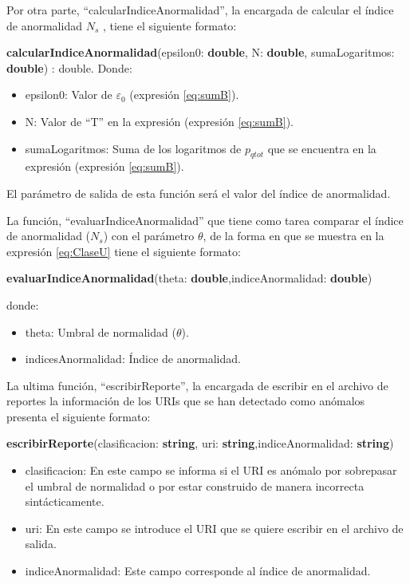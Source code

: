Por otra parte, ``calcularIndiceAnormalidad'', la encargada de calcular
el  índice de anormalidad $N_{s}$ , tiene el siguiente formato:

\textbf{calcularIndiceAnormalidad}(epsilon0: \textbf{double}, N: \textbf{double}, sumaLogaritmos: \textbf{double}) : double. Donde:

\begin{itemize}
\item epsilon0: Valor de $\varepsilon_{0}$ (expresión \ref{eq:sumB}).
\item N: Valor de ``T'' en la expresión (expresión \ref{eq:sumB}).
\item sumaLogaritmos: Suma de los logaritmos de $p_{qtot}$ que se encuentra en la expresión (expresión \ref{eq:sumB}).
\end{itemize}

El parámetro de salida de esta función será el valor del  índice de anormalidad.

La función, ``evaluarIndiceAnormalidad'' que tiene como tarea comparar el  índice de anormalidad ($N_{s}$) con el parámetro $\theta$, de la forma en que se muestra en la expresión \ref{eq:ClaseU} tiene el siguiente formato:

\textbf{evaluarIndiceAnormalidad}(theta: \textbf{double},indiceAnormalidad: \textbf{double})

donde:
\begin{itemize}
\item theta: Umbral de normalidad ($\theta$).
\item indicesAnormalidad: Índice de anormalidad.
\end{itemize}

La ultima función, ``escribirReporte'', la encargada de escribir en el archivo de reportes la información de los URIs que se han detectado como
anómalos presenta el siguiente formato:

\textbf{escribirReporte}(clasificacion: \textbf{string},
uri: \textbf{string},indiceAnormalidad: \textbf{string})

\begin{itemize}
\item clasificacion: En este campo se informa si el URI es anómalo por sobrepasar el umbral de normalidad o por estar construido de manera
incorrecta sintácticamente.
\item uri: En este campo se introduce el URI que se quiere escribir en el
archivo de salida.
\item indiceAnormalidad: Este campo corresponde al índice de anormalidad.
\end{itemize}

